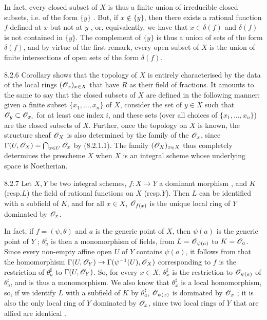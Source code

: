 In fact, every closed subset of $X$ is thus a finite union of irreducible closed
subsets, i.e. of the form $\overline{\{y\}}$ . But, if
$x\not\in\overline{\{y\}}$, then there exists a rational function $f$ defined at
$x$ but not at $y$ , or, equivalently, we have that $x\in\delta(f)$
and $\delta(f)$ is not contained in $\overline{\{y\}}$. The complement  of
$\overline{\{y\}}$ is thus a union of sets of the form $\delta(f)$, and by
virtue of the first remark, every open subset of $X$ is the union of finite
intersections of open sets of the form $\delta(f)$.

\begin{env}{8.2.6}
\label{env-1.8.2.6}
Corollary  shows that the topology of $X$ is
entirely characterised by the data of the local rings $(\mathscr{O}_x)_{x\in X}$ that
have $R$ as their field of fractions. It amounts to the same to say that the
closed subsets of $X$ are defined in the following manner: given a finite subset
$\{x_1,\ldots,x_n\}$ of $X$, consider the set of $y\in X$ such that
$\mathscr{O}_y\subset\mathscr{O}_{x_i}$ for at least one index $i$, and these sets (over all
choices of $\{x_1,\ldots,x_n\}$) are the closed subsets of $X$. Further, once
the topology on $X$ is known, the structure sheaf $\mathscr{O}_X$ is also determined by
the family of the $\mathscr{O}_x$, since $\Gamma(U,\mathscr{O}_X)=\bigcap_{x\in U}\mathscr{O}_x$ by
(8.2.1.1). The family $(\mathscr{O}_X)_{x\in X}$ thus completely determines the
prescheme $X$ when $X$ is an integral scheme whose underlying space is
Noetherian.
\end{env}

\begin{envs}[Proposition]{8.2.7}
\label{prop-1.8.2.7}
Let $X,Y$ be two integral schemes, $f:X\to Y$ a dominant morphism
, and $K$ (resp.$L$) the field of rational
functions on $X$ (resp.$Y$). Then $L$ can be identified with a subfield of
$K$, and for all $x\in X$, $\mathscr{O}_{f(x)}$ is the unique local ring of $Y$ dominated
by $\mathscr{O}_x$.
\end{envs}

In fact, if $f=(\psi,\theta)$ and $a$ is the generic point of $X$, then
$\psi(a)$ is the generic point of $Y$ ; $\theta_a^\sharp$ is then
a monomorphism of fields, from $L=\mathscr{O}_{\psi(a)}$ to $K=\mathscr{O}_a$. Since every
non-empty affine open $U$ of $Y$ contains $\psi(a)$, it follows from
 that the homomorphism $\Gamma(U,\mathscr{O}_Y)\to\Gamma(\psi^{-1}(U),\mathscr{O}_X)$
corresponding to $f$ is the restriction of $\theta_a^\sharp$ to $\Gamma(U,\mathscr{O}_Y)$.
So, for every $x\in X$, $\theta_x^\sharp$ is the restriction to $\mathscr{O}_{\psi(a)}$ of
$\theta_a^\sharp$, and is thus a monomorphism. We also know that $\theta_x^\sharp$ is a
local homomorphism, so, if we identify $L$ with a subfield of $K$ by
$\theta_a^\sharp$, $\mathscr{O}_{\psi(x)}$ is dominated by $\mathscr{O}_x$ ; it is also
the only local ring of $Y$ dominated by $\mathscr{O}_x$, since two local rings of $Y$
that are allied are identical .

